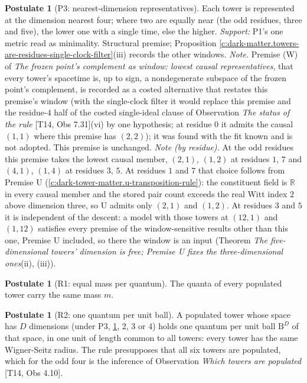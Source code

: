 \documentclass[11pt]{article}
\theoremstyle{definition}
\newtheorem{postulate}[theorem]{Postulate}
\theoremstyle{plain}
\providecommand{\B}{}\renewcommand{\B}{\mathrm{B}}
\providecommand{\R}{}\renewcommand{\R}{\mathbb{R}}
\begin{document}
\begin{postulate}[P3: nearest-dimension representatives]\label{c:dark-matter.p3-nearest-dimension-representatives}
Each tower is represented at the dimension nearest four; where two are equally near (the odd residues, three and five), the lower one with a single time, else the higher. \emph{Support:} P1's one metric read as minimality. Structural premise; Proposition \ref{c:dark-matter.towers-are-residues-single-clock-filter}(iii) records the other windows. \emph{Note.} Premise (W) of \emph{The frozen point's complement as window: lowest causal representatives}, that every tower's spacetime is, up to sign, a nondegenerate subspace of the frozen point's complement, is recorded as a costed alternative that restates this premise's window (with the single-clock filter it would replace this premise and the residue-$4$ half of the costed single-ideal clause of Observation \emph{The status of the rule} [T14, Obs 7.31](vi) by one hypothesis; at residue $0$ it admits the causal $(1,1)$ where this premise has $(2,2)$); it was found with the fit known and is not adopted. This premise is unchanged. \emph{Note (by residue).} At the odd residues this premise takes the lowest causal member, $(2,1)$, $(1,2)$ at residues $1$, $7$ and $(4,1)$, $(1,4)$ at residues $3$, $5$. At residues $1$ and $7$ that choice follows from Premise U (\ref{c:dark-tower-matter.u-transposition-rule}): the constituent field is $\R$ in every causal member and the stored pair count exceeds the real Witt index $2$ above dimension three, so U admits only $(2,1)$ and $(1,2)$. At residues $3$ and $5$ it is independent of the descent: a model with those towers at $(12,1)$ and $(1,12)$ satisfies every premise of the window-sensitive results other than this one, Premise U included, so there the window is an input (Theorem \emph{The five-dimensional towers' dimension is free; Premise U fixes the three-dimensional ones}(ii), (iii)).
\end{postulate}

\begin{postulate}[R1: equal mass per quantum]\label{c:dark-matter.r1-equal-mass-per-quantum}
The quanta of every populated tower carry the same mass $m$.
\end{postulate}

\begin{postulate}[R2: one quantum per unit ball]\label{c:dark-matter.r2-one-quantum-per-unit-ball}
A populated tower whose space has $D$ dimensions (under P3, \ref{c:dark-matter.p3-nearest-dimension-representatives}, $2$, $3$ or $4$) holds one quantum per unit ball $\B^{D}$ of that space, in one unit of length common to all towers: every tower has the same Wigner-Seitz radius. The rule presupposes that all six towers are populated, which for the odd four is the inference of Observation \emph{Which towers are populated} [T14, Obs 4.10].
\end{postulate}
\end{document}
